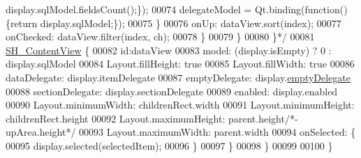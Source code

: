 \begin{DoxyCode}
{       display.sqlModel.fieldsCount();\});}
00074 \textcolor{comment}{                        delegateModel = Qt.binding(function() \{return display.sqlModel;\});}
00075 \textcolor{comment}{                    \}}
00076 \textcolor{comment}{                    onUp: dataView.sort(index);}
00077 \textcolor{comment}{                    onChecked: dataView.filter(index, ch);}
00078 \textcolor{comment}{                \}}
00079 \textcolor{comment}{            \}}
00080 \textcolor{comment}{        \}*/}
00081         \hyperlink{classSH__ContentView}{SH\_ContentView} \{
00082             \textcolor{keywordtype}{id}:dataView
00083             model: (display.isEmpty) ? 0 : display.sqlModel
00084             Layout.fillHeight: \textcolor{keyword}{true}
00085             Layout.fillWidth: \textcolor{keyword}{true}
00086             dataDelegate: display.itemDelegate
00087             emptyDelegate:  display.\hyperlink{classSH__ContentView_a243657fbb9155fd4af8e14c225795aa8}{emptyDelegate}
00088             sectionDelegate:  display.sectionDelegate
00089             enabled: display.enabled
00090             Layout.minimumWidth: childrenRect.width
00091             Layout.minimumHeight: childrenRect.height
00092             Layout.maximumHeight: parent.height\textcolor{comment}{/*-upArea.height*/}
00093             Layout.maximumWidth: parent.width
00094             onSelected: \{
00095                 display.selected(selectedItem);
00096             \}
00097         \}
00098     \}
00099 
00100 \}
\end{DoxyCode}
